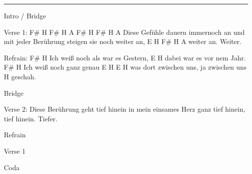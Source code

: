 \noindent\rule{\columnwidth}{1pt}

\begin{lstsong}
Intro / Bridge

Verse 1:
F#    H   F#  H A       F#   H    F#  H A
Diese Gefühle    dauern immernoch an     und
mit jeder Berührung steigen sie noch weiter an,
E      H   F#     H A
weiter an. Weiter.

Refrain:
F#                       H
Ich weiß noch als war es Gestern,
      E              H
dabei war es vor nem Jahr.
F#                 H
Ich weiß noch ganz genau
         E        H       E         H
was dort zwischen uns, ja zwischen uns
H
geschah.

Bridge

Verse 2:
Diese Berührung geht tief hinein
in mein einsames Herz ganz tief hinein,
tief hinein. Tiefer.

Refrain

Verse 1

Coda
\end{lstsong}
\newpage

